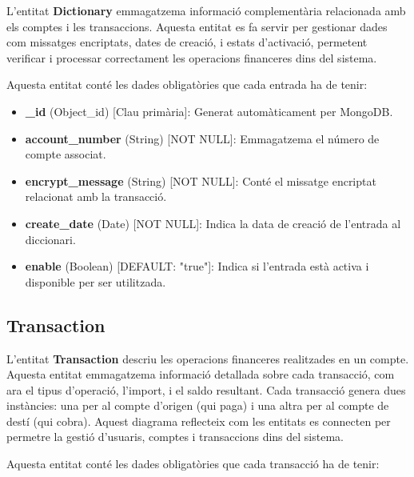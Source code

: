 \documentclass[a4paper,12pt,twoside]{ThesisStyle}
\begin{document}
L'entitat \textbf{Dictionary} emmagatzema informació complementària relacionada amb els comptes i les transaccions. Aquesta entitat es fa servir per gestionar dades com missatges encriptats, dates de creació, i estats d'activació, permetent verificar i processar correctament les operacions financeres dins del sistema.

Aquesta entitat conté les dades obligatòries que cada entrada ha de tenir:

\begin{itemize}
    \item \textbf{\_id} (Object\_id) [Clau primària]: Generat automàticament per MongoDB.
    \item \textbf{account\_number} (String) [NOT NULL]: Emmagatzema el número de compte associat.
    \item \textbf{encrypt\_message} (String) [NOT NULL]: Conté el missatge encriptat relacionat amb la transacció.
    \item \textbf{create\_date} (Date) [NOT NULL]: Indica la data de creació de l'entrada al diccionari.
    \item \textbf{enable} (Boolean) [DEFAULT: "true"]: Indica si l'entrada està activa i disponible per ser utilitzada.
\end{itemize}



\subsection{Transaction}
\label{subsec: Transaction}


L'entitat \textbf{Transaction} descriu les operacions financeres realitzades en un compte. Aquesta entitat emmagatzema informació detallada sobre cada transacció, com ara el tipus d'operació, l'import, i el saldo resultant. Cada transacció genera dues instàncies: una per al compte d'origen (qui paga) i una altra per al compte de destí (qui cobra). Aquest diagrama reflecteix com les entitats es connecten per permetre la gestió d'usuaris, comptes i transaccions dins del sistema.

Aquesta entitat conté les dades obligatòries que cada transacció ha de tenir:
\end{document}
